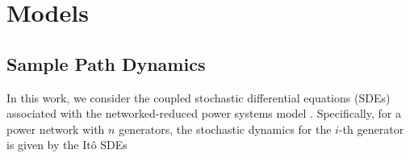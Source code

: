 \documentclass[10pt,twocolumn]{IEEEtran}
\begin{document}

\section{Models}\label{sec:models}

\subsection{Sample Path Dynamics}\label{subsec:samplepathdynamics}

%
%
In this work, we consider the coupled stochastic differential equations (SDEs) associated with the networked-reduced power systems model \cite[Ch. 7]{sauerpai1998}. Specifically, for a power network with $n$ generators, the stochastic dynamics for the $i$-th generator is given by the It\^{o} SDEs
\end{document}
